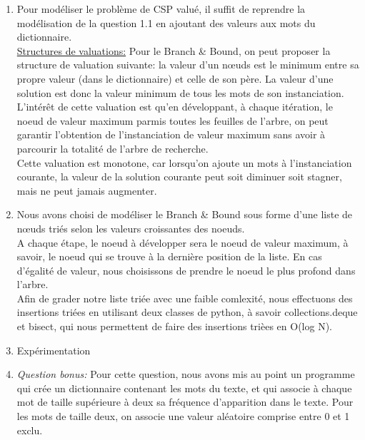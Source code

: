 \documentclass[a4paper,12pt]{report}
\begin{document}
\begin{enumerate}

\item Pour modéliser le problème de CSP valué, il suffit de reprendre la modélisation de la question 1.1 en ajoutant des valeurs aux mots du dictionnaire.\\
\ul{Structures de valuations:} Pour le Branch \& Bound, on peut proposer la structure de valuation suivante: la valeur d'un nœuds est le minimum entre sa propre valeur (dans le dictionnaire) et celle de son père. La valeur d'une solution est donc la valeur minimum de tous les mots de son instanciation.\\
L'intérêt de cette valuation est qu'en développant, à chaque itération, le noeud de valeur maximum parmis toutes les feuilles de l'arbre, on peut garantir l'obtention de l'instanciation de valeur maximum sans avoir à parcourir la totalité de l'arbre de recherche.\\
Cette valuation est monotone, car lorsqu'on ajoute un mots à l'instanciation courante, la valeur de la solution courante peut soit diminuer soit stagner, mais ne peut jamais augmenter.\\

\item Nous avons choisi de modéliser le Branch \& Bound sous forme d'une liste de nœuds triés selon les valeurs croissantes des noeuds.\\
A chaque étape, le noeud à développer sera le noeud de valeur maximum, à savoir, le noeud qui se trouve à la dernière position de la liste. En cas d'égalité de valeur, nous choisissons de prendre le noeud le plus profond dans l'arbre.\\
Afin de grader notre liste triée avec une faible comlexité, nous effectuons des insertions triées en utilisant deux classes de python, à savoir collections.deque et bisect, qui nous permettent de faire des insertions trièes en O(log N).\\

\item Expérimentation \\

\item \textit{Question bonus:} Pour cette question, nous avons mis au point un programme qui crée un dictionnaire contenant les mots du texte, et qui associe à chaque mot de taille supérieure à deux sa fréquence d'apparition dans le texte. Pour les mots de taille deux, on associe une valeur aléatoire comprise entre 0 et 1 exclu.\\

\end{enumerate}
\end{document}
